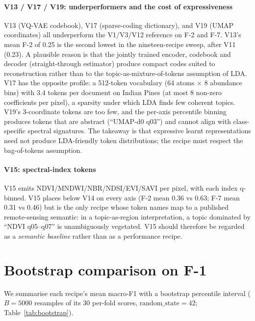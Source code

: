 \documentclass[journal,a4paper,10pt]{IEEEtran}
\begin{document}
\paragraph{V13 / V17 / V19: underperformers and the cost of
expressiveness}
V13 (VQ-VAE codebook), V17 (sparse-coding dictionary), and V19 (UMAP
coordinates) all underperform the V1/V3/V12 reference on F-2 and F-7.
V13's mean F-2 of 0.25 is the second lowest in the nineteen-recipe
sweep, after V11 (0.23). A plausible reason is that the jointly
trained encoder, codebook and decoder (straight-through estimator)
produce compact codes suited to reconstruction rather than to the
topic-as-mixture-of-tokens assumption of LDA. V17 has the opposite
profile: a 512-token vocabulary (64 atoms $\times$ 8 abundance bins)
with 3.4 tokens per document on Indian Pines (at most 8 non-zero
coefficients per pixel), a sparsity under which LDA finds few coherent
topics. V19's
3-coordinate tokens are too few, and the per-axis percentile binning
produces tokens that are abstract (``UMAP-d0 q03'') and cannot align
with class-specific spectral signatures. The takeaway is that
expressive learnt representations need not produce LDA-friendly token
distributions; the recipe must respect the bag-of-tokens assumption.

\paragraph{V15: spectral-index tokens}
V15 emits NDVI/MNDWI/NBR/NDSI/EVI/SAVI per pixel, with each index
q-binned. V15 places below V14 on every axis (F-2 mean 0.36 vs 0.63;
F-7 mean 0.31 vs 0.46) but is the only recipe whose token names map
to a published remote-sensing semantic: in a topic-as-region
interpretation, a topic dominated by ``NDVI q05--q07'' is unambiguously
vegetated. V15 should therefore be regarded as a \emph{semantic
baseline} rather than as a performance recipe.

\section{Bootstrap comparison on F-1}\label{sec:bayes}

We summarise each recipe's mean macro-F1 with a bootstrap percentile
interval ($B = 5000$ resamples of its 30 per-fold scores,
$\mathrm{random\_state} = 42$; Table~\ref{tab:bootstrap}).
\end{document}
